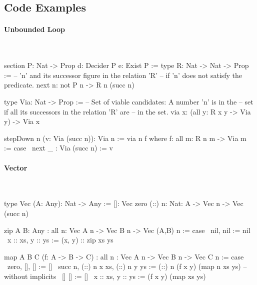 \subsection{Code Examples}



\paragraph{Unbounded Loop}

\ \begin{alba}
    section
        P: Nat -> Prop
        d: Decider P
        e: Exist P
    :=
        type R: Nat -> Nat -> Prop :=
                -- 'n' and its successor figure in the relation 'R'
                -- if 'n' does not satisfy the predicate.
            next {n}: not P n -> R n (succ n)

        type Via: Nat -> Prop :=
                -- Set of viable candidates: A number 'n' is in the
                -- set if all its successors in the relation 'R' are
                -- in the set.
            via {x}: (all {y}: R x y -> Via y) -> Via x

        stepDown {n} (v: Via (succ n)): Via n :=
            via {n} f where
                f: all {m}: R n m -> Via m
                := case
                    \ next _ : Via (succ n) := v
\end{alba}


\paragraph{Vector}

\ \begin{alba}
    type Vec (A: Any): Nat -> Any :=
        []:  Vec zero
        (::) {n: Nat}: A -> Vec n -> Vec (succ n)

    zip {A B: Any}
    : all {n}: Vec A n -> Vec B n -> Vec (A,B) n
    := case
        \ nil,     nil     := nil
        \ x :: xs, y :: ys := (x, y) :: zip xs ys
\end{alba}

\begin{alba}
    map {A B C} (f: A -> B -> C)
        : all {n}
          : Vec A n -> Vec B n -> Vec C n
    := case
        \ {zero},   [],            [] :=
            []
        \ {succ n}, (::) {n} x xs, (::) {n} y ys :=
            (::) {n} (f x y) (map {n} xs ys)
        -- without implicits
        \ [] []            := []
        \ x :: xs, y :: ys := (f x y) (map xs ys)
\end{alba}





